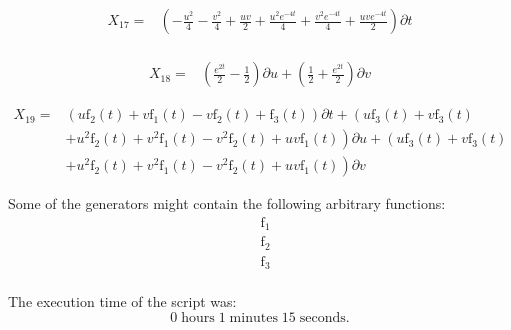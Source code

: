 \begin{align*}
X_{17}=&\left(- \frac{u^{2}}{4}- \frac{v^{2}}{4}+\frac{u v}{2}+\frac{u^{2} e^{- 4 t}}{4}+\frac{v^{2} e^{- 4 t}}{4}+\frac{u v e^{- 4 t}}{2} \right)\partial t\\
\end{align*}

\begin{align*}
X_{18}=&\left(\frac{e^{2 t}}{2} - \frac{1}{2} \right)\partial u+\left(\frac{1}{2}+\frac{e^{2 t}}{2} \right)\partial v
\end{align*}

\begin{align*}
X_{19}=&\left(u \operatorname{f_{2}}{\left(t \right)}+v \operatorname{f_{1}}{\left(t \right)}- v \operatorname{f_{2}}{\left(t \right)}+\operatorname{f_{3}}{\left(t \right)} \right)\partial t+\left(u \operatorname{f_{3}}{\left(t \right)}+v \operatorname{f_{3}}{\left(t \right)}\right.\\
&+\left.u^{2} \operatorname{f_{2}}{\left(t \right)}+v^{2} \operatorname{f_{1}}{\left(t \right)}- v^{2} \operatorname{f_{2}}{\left(t \right)}+u v \operatorname{f_{1}}{\left(t \right)} \right)\partial u+\left(u \operatorname{f_{3}}{\left(t \right)}+v \operatorname{f_{3}}{\left(t \right)}\right.\\
&+\left.u^{2} \operatorname{f_{2}}{\left(t \right)}+v^{2} \operatorname{f_{1}}{\left(t \right)}- v^{2} \operatorname{f_{2}}{\left(t \right)}+u v \operatorname{f_{1}}{\left(t \right)} \right)\partial v
\end{align*}



\noindent Some of the generators might contain the following arbitrary functions:
\begin{align*}
&\operatorname{f_{1}}\\
&\operatorname{f_{2}}\\
&\operatorname{f_{3}}\\
\end{align*}

\noindent The execution time of the script was:
$$0\;\mathrm{hours}\;1\;\mathrm{minutes}\;15 \;\mathrm{seconds}.$$
